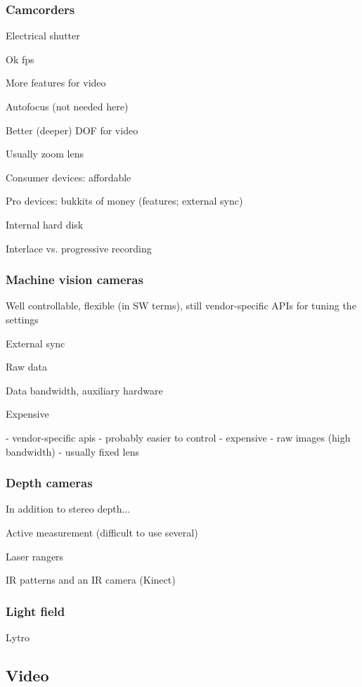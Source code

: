 \subsubsection{Camcorders}

Electrical shutter

Ok fps

More features for video

Autofocus (not needed here)

Better (deeper) DOF for video

Usually zoom lens

Consumer devices: affordable

Pro devices: bukkits of money (features; external sync)

Internal hard disk

Interlace vs. progressive recording

\subsubsection{Machine vision cameras}

Well controllable, flexible (in SW terms), still vendor-specific APIs for tuning the settings

External sync

Raw data

Data bandwidth, auxiliary hardware

Expensive

  - vendor-specific apis
  - probably easier to control
  - expensive
  - raw images (high bandwidth)
  - usually fixed lens
\subsubsection{Depth cameras}

In addition to stereo depth...

Active measurement (difficult to use several)

Laser rangers

IR patterns and an IR camera (Kinect)

\subsubsection{Light field}

Lytro

\subsection{Video}

